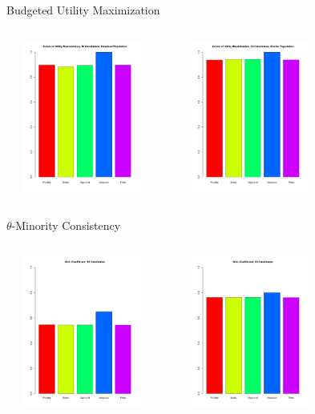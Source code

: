 \documentclass{beamer}
\begin{document}
\begin{frame}{Budgeted Utility Maximization}
	\begin{columns}
             \centering
             \includegraphics[height=5cm, width=5cm]{Presentation_Plots/Axiom_of_Utility_Maximization_20_Candidates_Polarized_Population.pdf}

	 \centering
             \includegraphics[height=5cm, width=5cm]{Presentation_Plots/Axiom_of_Utility_Maximization_20_Candidates_Similar_Population.pdf}
         \end{columns} 
\end{frame}

\begin{frame}{$\theta$-Minority Consistency}
\begin{columns}
             \centering
             \includegraphics[height=5cm, width=5cm]{Gini_Coefficient_10_Candidates.pdf}
             
	 \centering
             \includegraphics[height=5cm, width=5cm]{Gini_Coefficient_20_Candidates.pdf}
         \end{columns} 
\end{frame}
\end{document}
